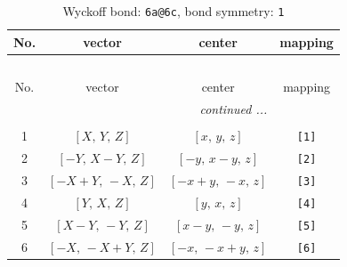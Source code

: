 \documentclass[fleqn,8pt]{jsarticle}
\begin{document}
\begin{longtable}{cccc}
\caption{Wyckoff bond: {\tt 6a@6c}, bond symmetry: {\tt 1}}
 \\
 \hline \hline
No. & vector & center & mapping \\ \hline \endfirsthead

\multicolumn{3}{l}{\tablename\ \thetable{}} \\
 \hline \hline
No. & vector & center & mapping \\ \hline \endhead

 \hline \hline
\multicolumn{3}{r}{\footnotesize\it continued ...} \\ \endfoot

 \hline \hline
\multicolumn{3}{r}{} \\ \endlastfoot

1 & $\left[ X,\, Y,\, Z \right]$ & $\left[ x,\, y,\, z \right]$ & {\tt [1]} \\ \hline
2 & $\left[ - Y,\, X - Y,\, Z \right]$ & $\left[ - y,\, x - y,\, z \right]$ & {\tt [2]} \\ \hline
3 & $\left[ - X + Y,\, - X,\, Z \right]$ & $\left[ - x + y,\, - x,\, z \right]$ & {\tt [3]} \\ \hline
4 & $\left[ Y,\, X,\, Z \right]$ & $\left[ y,\, x,\, z \right]$ & {\tt [4]} \\ \hline
5 & $\left[ X - Y,\, - Y,\, Z \right]$ & $\left[ x - y,\, - y,\, z \right]$ & {\tt [5]} \\ \hline
6 & $\left[ - X,\, - X + Y,\, Z \right]$ & $\left[ - x,\, - x + y,\, z \right]$ & {\tt [6]} \\
\end{longtable}
\end{document}
